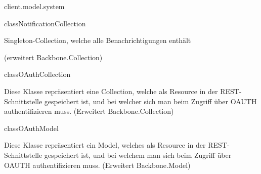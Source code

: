 \begin{texdocpackage}{client.model.system}
\begin{texdocclass}{class}{NotificationCollection}
\label{texdoclet:edu.kit.informatik.studyplan.client.model.system.NotificationCollection}
\begin{texdocclassintro}
Singleton-Collection, welche alle Benachrichtigungen enthält \texdocbr{}

 (erweitert Backbone.Collection)\end{texdocclassintro}
\begin{texdocclassconstructors}
\end{texdocclassconstructors}
\begin{texdocclassmethods}
\end{texdocclassmethods}
\end{texdocclass}


\begin{texdocclass}{class}{OAuthCollection}
\label{texdoclet:edu.kit.informatik.studyplan.client.model.system.OAuthCollection}
\begin{texdocclassintro}
Diese Klasse repräsentiert eine Collection, welche als Resource in der
 REST-Schnittstelle gespeichert ist, und bei welcher sich man beim Zugriff
 über OAUTH authentifizieren muss. (Erweitert Backbone.Collection)\end{texdocclassintro}
\begin{texdocclassconstructors}
\end{texdocclassconstructors}
\end{texdocclass}


\begin{texdocclass}{class}{OAuthModel}
\label{texdoclet:edu.kit.informatik.studyplan.client.model.system.OAuthModel}
\begin{texdocclassintro}
Diese Klasse repräsentiert ein Model, welches als Resource in der
 REST-Schnittstelle gespeichert ist, und bei welchem man sich beim Zugriff
 über OAUTH authentifizieren muss. (Erweitert Backbone.Model)\end{texdocclassintro}
\begin{texdocclassconstructors}
\end{texdocclassconstructors}
\end{texdocclass}



\end{texdocpackage}
